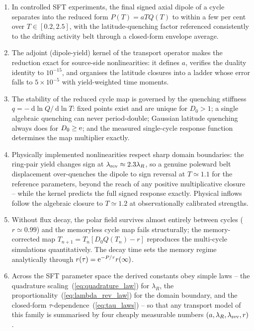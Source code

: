 \documentclass[namedreferences,hyperref,optionalrh,solaromanenum]{spr-sola}
\newcommand{\rmd}{{\ \mathrm d}}
\begin{document}
\begin{enumerate}
\item
In controlled SFT experiments, the final signed axial dipole of a cycle
separates into the reduced form $P(T)=aTQ(T)$ to within a few per cent
over $T\in[0.2,2.5]$, with the latitude-quenching factor referenced
consistently to the drifting activity belt through a closed-form envelope
average.
\item
The adjoint (dipole-yield) kernel of the transport operator makes the
reduction exact for source-side nonlinearities: it defines $a$, verifies
the duality identity to $10^{-15}$, and organises the latitude closures
into a ladder whose error falls to $5\times10^{-5}$ with yield-weighted
time moments.
\item
The stability of the reduced cycle map is governed by the quenching
stiffness $q=-\rmd\ln Q/\rmd\ln T$: fixed points exist and are unique for
$D_0>1$; a single algebraic quenching can never period-double; Gaussian
latitude quenching always does for $D_0\ge{\rm e}$; and the measured
single-cycle response function determines the map multiplier exactly.
\item
Physically implemented nonlinearities respect sharp domain boundaries:
the ring-pair yield changes sign at $\lambda_{\rm rev}\approx2.3\lambda_R$,
so a genuine poleward belt displacement over-quenches the dipole to sign
reversal at $T\simeq1.1$ for the reference parameters, beyond the reach of
any positive multiplicative closure -- while the kernel predicts the full
signed response exactly. Physical inflows follow the algebraic closure to
$T\simeq1.2$ at observationally calibrated strengths.
\item
Without flux decay, the polar field survives almost entirely between
cycles ($r\simeq0.99$) and the memoryless cycle map fails structurally;
the memory-corrected map $T_{n+1}=T_n[D_0Q(T_n)-r]$ reproduces the
multi-cycle simulations quantitatively. The decay time sets the memory
regime analytically through $r(\tau)={\rm e}^{-P/\tau}r(\infty)$.
\item
Across the SFT parameter space the derived constants obey simple laws --
the quadrature scaling~(\ref{eq:quadrature_law}) for $\lambda_R$, the
proportionality~(\ref{eq:lambda_rev_law}) for the domain boundary, and
the closed-form $\tau$-dependence~(\ref{eq:tau_laws}) -- so that any
transport model of this family is summarised by four cheaply measurable
numbers $(a,\lambda_R,\lambda_{\rm rev},r)$.
\end{enumerate}
\end{document}
